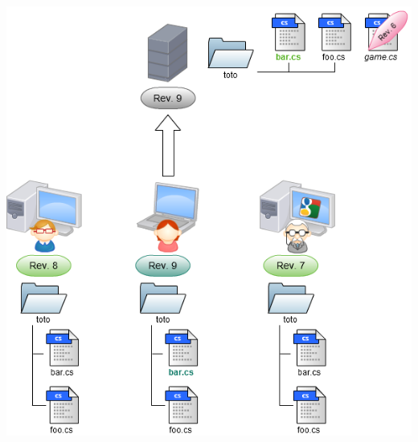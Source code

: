 \begin{frame}
  \begin{center}
    \includegraphics[scale=0.3]{images/15-Resolved.png}
  \end{center}
\end{frame}

